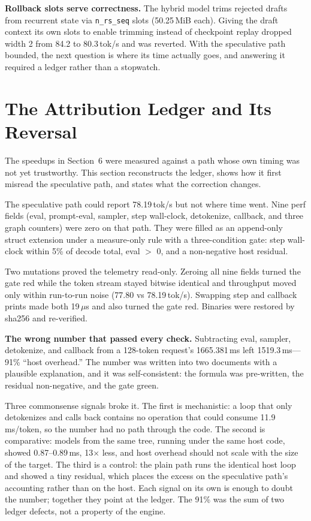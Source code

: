 \documentclass[letterpaper,twocolumn,10pt]{article}
\begin{document}
\textbf{Rollback slots serve correctness.} The hybrid model trims rejected
drafts from recurrent state via \texttt{n\_rs\_seq} slots (50.25\,MiB each).
Giving the draft context its own slots to enable trimming instead of
checkpoint replay dropped width 2 from 84.2 to 80.3\,tok/s and was reverted.
With the speculative path bounded, the next question is where its time
actually goes, and answering it required a ledger rather than a stopwatch.

\section{The Attribution Ledger and Its Reversal}

The speedups in Section~6 were measured against a path whose own timing was
not yet trustworthy. This section reconstructs the ledger, shows how it first
misread the speculative path, and states what the correction changes.

The speculative path could report 78.19\,tok/s but not where time went. Nine
perf fields (eval, prompt-eval, sampler, step wall-clock, detokenize, callback,
and three graph counters) were zero on that path. They were filled as an
append-only struct extension under a measure-only rule with a three-condition
gate: step wall-clock within 5\% of decode total, eval $>$ 0, and a
non-negative host residual.

Two mutations proved the telemetry read-only. Zeroing all nine fields turned
the gate red while the token stream stayed bitwise identical and throughput
moved only within run-to-run noise (77.80 vs 78.19\,tok/s). Swapping step and
callback prints made both 19\,$\mu$s and also turned the gate red. Binaries
were restored by sha256 and re-verified.

\textbf{The wrong number that passed every check.} Subtracting eval, sampler,
detokenize, and callback from a 128-token request's 1665.381\,ms left
1519.3\,ms---91\% ``host overhead.'' The number was written into two documents
with a plausible explanation, and it was self-consistent: the formula was
pre-written, the residual non-negative, and the gate green.

Three commonsense signals broke it. The first is mechanistic: a loop that only
detokenizes and calls back contains no operation that could consume
11.9\,ms/token, so the number had no path through the code. The second is
comparative: models from the same tree, running under the same host code,
showed 0.87--0.89\,ms, 13$\times$ less, and host overhead should not scale
with the size of the target. The third is a control: the plain path runs the
identical host loop and showed a tiny residual, which places the excess on the
speculative path's accounting rather than on the host. Each signal on its own
is enough to doubt the number; together they point at the ledger. The 91\% was
the sum of two ledger defects, not a property of the engine.
\end{document}
